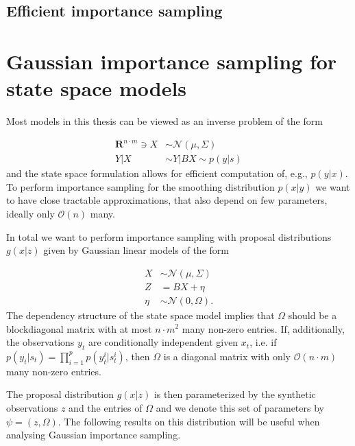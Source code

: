 \subsection{Efficient importance sampling}


\section{Gaussian importance sampling for state space models}
\label{sec:gaussian_importance_sampling_for_state_space_models}

Most models in this thesis can be viewed as an inverse problem of the form

\begin{align*}
    \mathbf{R}^{n\cdot m} \ni X & \sim \mathcal N(\mu, \Sigma) \\
    Y|X                         & \sim Y|BX \sim p(y|s)
\end{align*}
and the state space formulation allows for efficient computation of, e.g., $p(y|x)$.
To perform importance sampling for the smoothing distribution $p(x|y)$ we want to have close tractable approximations, that also depend on few parameters, ideally only $\mathcal O(n)$ many.


In total we want to perform importance sampling with proposal distributions $g(x|z)$ given by Gaussian linear models of the form

\begin{align*}
    X    & \sim \mathcal N(\mu, \Sigma) \\
    Z    & = BX + \eta                  \\
    \eta & \sim \mathcal N(0, \Omega).
\end{align*}
The dependency structure of the state space model implies that $\Omega$ should be a blockdiagonal matrix with at most $n \cdot m^{2}$ many non-zero entries.
If, additionally, the observations $y_{t}$ are conditionally independent given $x_{t}$, i.e. if $p(y_{t}|s_{t}) = \prod_{i = 1}^{p} p(y_{t}^{i}|s_{t}^i)$, then $\Omega$ is a diagonal matrix with only $\mathcal O(n \cdot m)$ many non-zero entries.

The proposal distribution $g(x|z)$ is then parameterized by the synthetic observations $z$ and the entries of $\Omega$ and we denote this set of parameters by $\psi = (z, \Omega)$.
The following results on this distribution will be useful when analysing Gaussian importance sampling.

